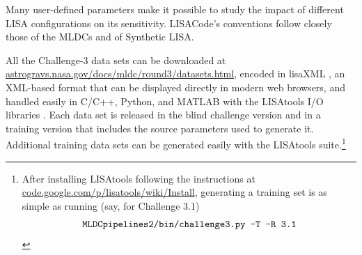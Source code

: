 \documentclass{iopart}
\begin{document}
Many user-defined parameters make it possible to study the impact of different LISA configurations on its sensitivity. LISACode's conventions follow closely those of the MLDCs and of Synthetic LISA.

All the Challenge-3 data sets can be downloaded at \url{astrogravs.nasa.gov/docs/mldc/round3/datasets.html}, encoded in lisaXML \cite{mldclisasymp}, an XML-based format that can be displayed directly in modern web browsers, and handled easily in C/C++, Python, and MATLAB with the LISAtools I/O libraries \cite{lisatools}. Each data set is released in the blind challenge version and in a training version that includes the source parameters used to generate it. Additional training data sets can be generated easily with the LISAtools suite.\footnote{After installing LISAtools following the instructions at \url{code.google.com/p/lisatools/wiki/Install}, generating a training set is as simple as running (say, for Challenge 3.1) 
\begin{displaymath}
\mbox{\texttt{MLDCpipelines2/bin/challenge3.py -T -R 3.1}}
\end{displaymath}}
\end{document}
